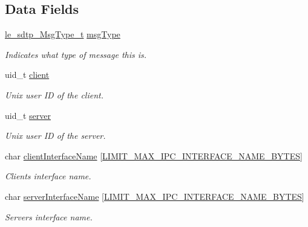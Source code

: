 \subsection*{Data Fields}
\begin{DoxyCompactItemize}
\item 
\hyperlink{sdir_tool_protocol_8h_a366fe235cd4284f4f35543cf1ec16e0d}{le\+\_\+sdtp\+\_\+\+Msg\+Type\+\_\+t} \hyperlink{structle__sdtp___msg__t_a4a393dfdfbca3db78edc868efdd402ca}{msg\+Type}
\begin{DoxyCompactList}\small\item\em Indicates what type of message this is. \end{DoxyCompactList}\item 
uid\+\_\+t \hyperlink{structle__sdtp___msg__t_ab5e9488fc3fa16c8b79eabd66ae5057f}{client}
\begin{DoxyCompactList}\small\item\em Unix user ID of the client. \end{DoxyCompactList}\item 
uid\+\_\+t \hyperlink{structle__sdtp___msg__t_adb2c9a19a46f521cdedb3fd20c0a6f04}{server}
\begin{DoxyCompactList}\small\item\em Unix user ID of the server. \end{DoxyCompactList}\item 
char \hyperlink{structle__sdtp___msg__t_ab658e8589c5bf771677b441eade22246}{client\+Interface\+Name} \mbox{[}\hyperlink{limit_8h_a06cfcaef1596f177e04ea0a131257c01}{L\+I\+M\+I\+T\+\_\+\+M\+A\+X\+\_\+\+I\+P\+C\+\_\+\+I\+N\+T\+E\+R\+F\+A\+C\+E\+\_\+\+N\+A\+M\+E\+\_\+\+B\+Y\+T\+ES}\mbox{]}
\begin{DoxyCompactList}\small\item\em Client\textquotesingle{}s interface name. \end{DoxyCompactList}\item 
char \hyperlink{structle__sdtp___msg__t_a483b0dc0d028f7b4a362799a591033ca}{server\+Interface\+Name} \mbox{[}\hyperlink{limit_8h_a06cfcaef1596f177e04ea0a131257c01}{L\+I\+M\+I\+T\+\_\+\+M\+A\+X\+\_\+\+I\+P\+C\+\_\+\+I\+N\+T\+E\+R\+F\+A\+C\+E\+\_\+\+N\+A\+M\+E\+\_\+\+B\+Y\+T\+ES}\mbox{]}
\begin{DoxyCompactList}\small\item\em Server\textquotesingle{}s interface name. \end{DoxyCompactList}\end{DoxyCompactItemize}


